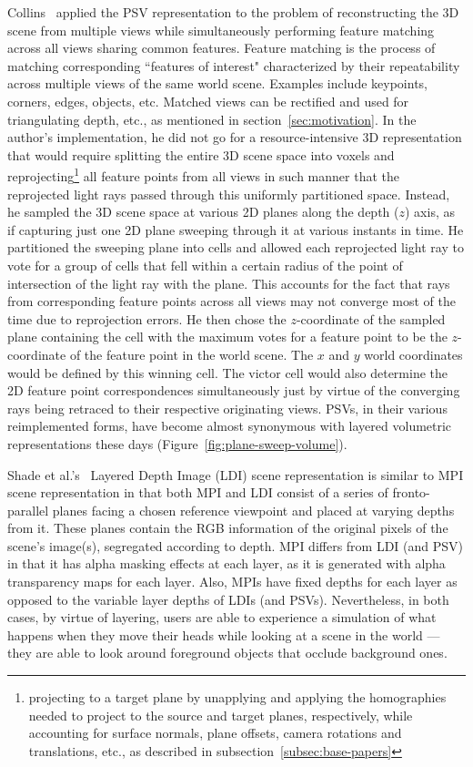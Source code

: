 Collins~\cite{collins_space-sweep_1996} applied the PSV representation to the problem of reconstructing the 3D scene from multiple views while simultaneously performing feature matching across all views sharing common features. Feature matching is the process of matching corresponding ``features of interest" characterized by their repeatability across multiple views of the same world scene. Examples include keypoints, corners, edges, objects, etc. Matched views can be rectified and used for triangulating depth, etc., as mentioned in section~\ref{sec:motivation}. In the author's implementation, he did not go for a resource-intensive 3D representation that would require splitting the entire 3D scene space into voxels and reprojecting\footnote{projecting to a target plane by unapplying and applying the homographies needed to project to the source and target planes, respectively, while accounting for surface normals, plane offsets, camera rotations and translations, etc., as described in subsection~\ref{subsec:base-papers}} all feature points from all views in such manner that the reprojected light rays passed through this uniformly partitioned space. Instead, he sampled the 3D scene space at various 2D planes along the depth ($z$) axis, as if capturing just one 2D plane sweeping through it at various instants in time. He partitioned the sweeping plane into cells and allowed each reprojected light ray to vote for a group of cells that fell within a certain radius of the point of intersection of the light ray with the plane. This accounts for the fact that rays from corresponding feature points across all views may not converge most of the time due to reprojection errors. He then chose the $z$-coordinate of the sampled plane containing the cell with the maximum votes for a feature point to be the $z$-coordinate of the feature point in the world scene. The $x$ and $y$ world coordinates would be defined by this winning cell. The victor cell would also determine the 2D feature point correspondences simultaneously just by virtue of the converging rays being retraced to their respective originating views. PSVs, in their various reimplemented forms, have become almost synonymous with layered volumetric representations these days (Figure~\ref{fig:plane-sweep-volume}).

Shade et al.'s~\cite{shade_layered_1998} Layered Depth Image (LDI) scene representation is similar to MPI scene representation in that both MPI and LDI consist of a series of fronto-parallel planes facing a chosen reference viewpoint and placed at varying depths from it. These planes contain the RGB information of the original pixels of the scene's image(s), segregated according to depth. MPI differs from LDI (and PSV) in that it has alpha masking effects at each layer, as it is generated with alpha transparency maps for each layer. Also, MPIs have fixed depths for each layer as opposed to the variable layer depths of LDIs (and PSVs). Nevertheless, in both cases, by virtue of layering, users are able to experience a simulation of what happens when they move their heads while looking at a scene in the world --- they are able to look around foreground objects that occlude background ones. 

